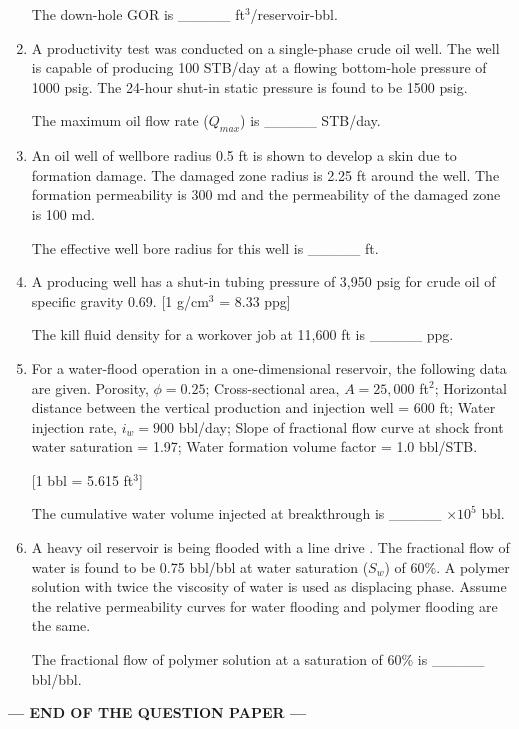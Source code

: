 \documentclass[journal]{IEEEtran}
\begin{document}
\begin{enumerate}
    The down-hole GOR is \_\_\_\_\_ ft$^3$/reservoir-bbl.
    
    \hfill{}
    
    \item A productivity test was conducted on a single-phase crude oil well. The well is capable of producing 100 STB/day at a flowing bottom-hole pressure of 1000 psig. The 24-hour shut-in static pressure is found to be 1500 psig.
    
    The maximum oil flow rate ($Q_{max}$) is \_\_\_\_\_ STB/day.
    
    \hfill{}
    
    \item An oil well of wellbore radius 0.5 ft is shown to develop a skin due to formation damage. The damaged zone radius is 2.25 ft around the well. The formation permeability is 300 md and the permeability of the damaged zone is 100 md.
    
    The effective well bore radius for this well is \_\_\_\_\_ ft.
    
    \hfill{}
    
    \item A producing well has a shut-in tubing pressure of 3,950 psig for crude oil of specific gravity 0.69. [1 g/cm$^3$ = 8.33 ppg]
    
    The kill fluid density for a workover job at 11,600 ft  is \_\_\_\_\_ ppg.
    
    \hfill{}
    
    \item For a water-flood operation in a one-dimensional reservoir, the following data are given. Porosity, $\phi = 0.25$; Cross-sectional area, $A = 25,000$ ft$^2$; Horizontal distance between the vertical production and injection well = 600 ft; Water injection rate, $i_w = 900$ bbl/day; Slope of fractional flow curve at shock front water saturation = 1.97; Water formation volume factor = 1.0 bbl/STB.
    
    [1 bbl = 5.615 ft$^3$]
    
    The cumulative water volume injected at breakthrough is \_\_\_\_\_ $\times 10^5$ bbl.
    
    \hfill{}
    
    \item A heavy oil reservoir is being flooded with a line drive . The fractional flow of water is found to be 0.75 bbl/bbl at water saturation ($S_w$) of 60\%. A polymer solution with twice the viscosity of water is used as displacing phase. Assume the relative permeability curves for water flooding and polymer flooding are the same.
    
    The fractional flow of polymer solution at a saturation of 60\% is \_\_\_\_\_ bbl/bbl.
    
    \hfill{}
\end{enumerate}              


\vspace{0.5cm}
\begin{center}
\textbf{\large --- END OF THE QUESTION PAPER ---}
\end{center}
\end{document}
